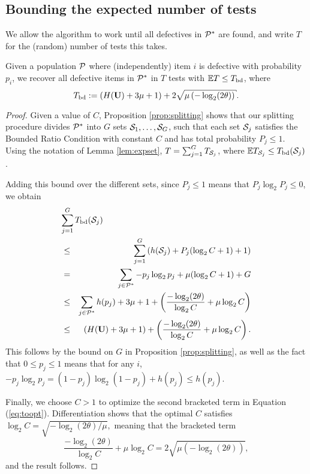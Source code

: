 \subsection{Bounding the expected number of tests} \label{sec:expectation}
%
We allow the algorithm to work until all defectives in ${\mathcal{P}}^*$ are found, and write $T$ for the (random) number of tests this takes.
%
\begin{proposition} \label{prop:overall} Given a population ${\mathcal{P}}$
where (independently) item $i$ is defective with probability $p_i$,  
we  recover  all defective items in ${\mathcal{P}}^*$ in $T$ tests with ${\mathbb{E}} T \leq T_{{\mathrm{bd}}}$, where
\begin{equation} \label{eq:tbd}
 T_{\bd} := \left( H( \vc{U}) + 3 \mu + 1 \right) +  
 2 \sqrt{ \mu  \left( -\log_2 (2\theta) \right)}.
\end{equation}
\end{proposition}
\begin{proof} Given a value of $C$,
Proposition \ref{prop:splitting} shows that our splitting procedure divides ${\mathcal{P}}^*$ into 
$G$ sets ${\mathcal{S}}_1, \ldots, {\mathcal{S}}_G$, such that each set ${\mathcal{S}}_j$ satisfies the Bounded Ratio Condition with constant $C$ and has total probability $P_j
\leq 1$. Using the notation of Lemma \ref{lem:expset}, $T = \sum_{j=1}^G T_{{\mathcal{S}}_j}$, where 
${\mathbb{E}} T_{{\mathcal{S}}_j} \leq  T_{{\mathrm{bd}}}({\mathcal{S}}_j)$.

Adding this bound over the different sets, since $P_j \leq 1$ means that $P_j \log_2 P_j \leq 0$, we obtain
\begin{eqnarray} \label{eq:total}
\lefteqn{ \sum_{j=1}^G T_{\bd}(\setS_j) } \nonumber \\
& \leq &  \sum_{j=1}^G \left(  h(\setS_j)  + P_j (\log_2 C+1) + 1 \right) \nonumber \\
& = & \sum_{j \in \setP^*} -p_j \log_2 p_j + \mu  (\log_2 C+1) + G \nonumber \\
& \leq & \sum_{j \in \setP^*} h(p_j)  + 3 \mu  +  1 + \left( \frac{ -\log_2 (2\theta)}{\log_2 C} +  \mu  \log_2 C \right)  
\nonumber \\
& \leq & \left( H( \vc{U}) + 3 \mu + 1 \right) +   \left( \frac{ -\log_2 (2 \theta)}{\log_2 C} +  \mu \log_2 C \right).
\label{eq:toopt}
\end{eqnarray}
This follows by the bound on $G$ in Proposition \ref{prop:splitting}, as well as 
the fact that $ 0 \leq p_j \leq 1$ means that 
 for any $i$, $ - p_j \log_2 p_j =  (1-p_j) \log_2 (1-p_j) + h(p_j) \leq h(p_j)$.

Finally, we  choose $C > 1$ to optimize the  second bracketed term in Equation (\ref{eq:toopt}).
Differentiation shows that the optimal $C$ satisfies $\log_2 C = \sqrt{ -\log_2 (2 \theta)/\mu},$ meaning that
 the 
bracketed term $$
\frac{ -\log_2 (2 \theta)}{\log_2 C} +  \mu \log_2 C  =
 2 \sqrt{ \mu  \left( -\log_2 (2\theta) \right)} ,$$
and the result follows.
\end{proof}

